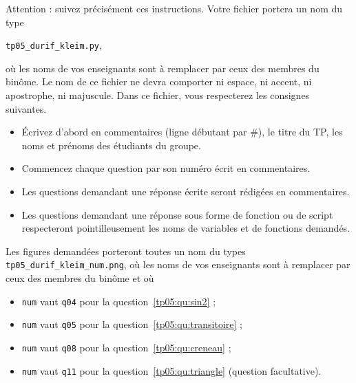 Attention : suivez précisément ces instructions. 
Votre fichier portera un nom du type 
\begin{center}
  \texttt{tp05\_durif\_kleim.py},
\end{center}
 où les noms de vos enseignants sont à remplacer par ceux des membres du binôme. Le nom de ce 
fichier ne devra comporter ni espace, ni accent, ni apostrophe, ni majuscule.
Dans ce fichier, vous respecterez les consignes suivantes.
\begin{itemize}
  \item \'Ecrivez d'abord en commentaires (ligne débutant par \#), le titre du TP, les noms et prénoms des étudiants du groupe.
  \item Commencez chaque question par son numéro écrit en commentaires.
  \item Les questions demandant une réponse écrite seront rédigées en commentaires.
  \item Les questions demandant une réponse sous forme de fonction ou de script respecteront pointilleusement les noms de variables et de fonctions demandés.
\end{itemize}
Les figures demandées porteront toutes un nom du types \texttt{tp05\_durif\_kleim\_num.png}, où les noms de vos enseignants sont à remplacer par ceux des membres du binôme et où
\begin{itemize}
  \item \texttt{num} vaut \texttt{q04} pour la question~\ref{tp05:qu:sin2} ;
  \item \texttt{num} vaut \texttt{q05} pour la question~\ref{tp05:qu:transitoire} ;
  \item \texttt{num} vaut \texttt{q08} pour la question~\ref{tp05:qu:creneau} ;
  \item \texttt{num} vaut \texttt{q11} pour la question~\ref{tp05:qu:triangle} (question facultative).
\end{itemize}